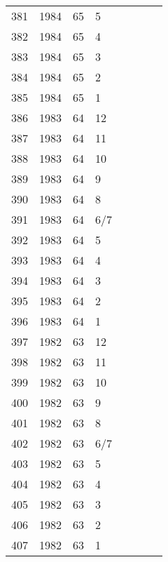 \begin{longtable}{ |l|l|l|l|l|l|l|l| }
381 & 1984 & 65 &     5 &         &                &  & \\
382 & 1984 & 65 &     4 &         &                &  & \\
383 & 1984 & 65 &     3 &         &                &  & \\
384 & 1984 & 65 &     2 &         &                &  & \\
385 & 1984 & 65 &     1 &         &                &  & \\
386 & 1983 & 64 &    12 &         &                &  & \\
387 & 1983 & 64 &    11 &         &                &  & \\
388 & 1983 & 64 &    10 &         &                &  & \\
389 & 1983 & 64 &     9 &         &                &  & \\
390 & 1983 & 64 &     8 &         &                &  & \\
391 & 1983 & 64 &   6/7 &         &                &  & \\
392 & 1983 & 64 &     5 &         &                &  & \\
393 & 1983 & 64 &     4 &         &                &  & \\
394 & 1983 & 64 &     3 &         &                &  & \\
395 & 1983 & 64 &     2 &         &                &  & \\
396 & 1983 & 64 &     1 &         &                &  & \\
397 & 1982 & 63 &    12 &         &                &  & \\
398 & 1982 & 63 &    11 &         &                &  & \\
399 & 1982 & 63 &    10 &         &                &  & \\
400 & 1982 & 63 &     9 &         &                &  & \\
401 & 1982 & 63 &     8 &         &                &  & \\
402 & 1982 & 63 &   6/7 &         &                &  & \\
403 & 1982 & 63 &     5 &         &                &  & \\
404 & 1982 & 63 &     4 &         &                &  & \\
405 & 1982 & 63 &     3 &         &                &  & \\
406 & 1982 & 63 &     2 &         &                &  & \\
407 & 1982 & 63 &     1 &         &                &  & \\

\end{longtable}
